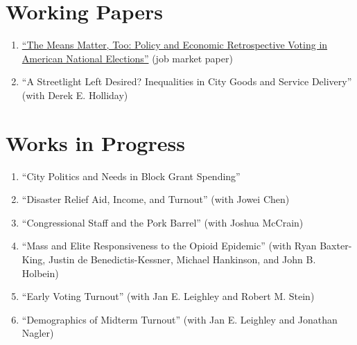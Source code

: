 \documentclass[12pt]{article}
\begin{document}



\section*{Working Papers}

\begin{enumerate}[topsep = 0pt, itemsep = 1ex, partopsep  = 1ex, parsep = 1ex]

	\item[] \href{https://www.brianhamel.me/files/new_deal.pdf}{``The Means Matter, Too: Policy and Economic Retrospective Voting in American National Elections''} (job market paper)
	
	\item[] ``A Streetlight Left Desired? Inequalities in City Goods and Service Delivery'' (with Derek E. Holliday)
	
\end{enumerate}
	
\section*{Works in Progress}

\begin{enumerate}[topsep = 0pt, itemsep = 1ex, partopsep  = 1ex, parsep = 1ex]
	
	\item[] ``City Politics and Needs in Block Grant Spending''
	
	\item[] ``Disaster Relief Aid, Income, and Turnout'' (with Jowei Chen)
	
	\item[] ``Congressional Staff and the Pork Barrel'' (with Joshua McCrain)
	
	\item[] ``Mass and Elite Responsiveness to the Opioid Epidemic'' (with Ryan Baxter-King, Justin de Benedictis-Kessner, Michael Hankinson, and John B. Holbein)
	
	\item[] ``Early Voting Turnout'' (with Jan E. Leighley and Robert M. Stein)
	
	\item[] ``Demographics of Midterm Turnout'' (with Jan E. Leighley and Jonathan Nagler)

\end{enumerate}
\end{document}
